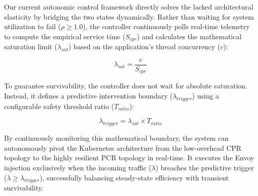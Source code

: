 \documentclass{ieeeaccess}
\begin{document}
Our current autonomic control framework directly solves the lacked architectural elasticity by bridging the two states dynamically. Rather than waiting for system utilization to fail ($\rho \ge 1.0$), the controller continuously polls real-time telemetry to compute the empirical service time ($S_{cpr}$) and calculates the mathematical saturation limit ($\lambda_{sat}$) based on the application's thread concurrency ($c$):

$$\lambda_{sat} = \frac{c}{S_{cpr}}$$

To guarantee survivability, the controller does not wait for absolute saturation. Instead, it defines a predictive intervention boundary ($\lambda_{trigger}$) using a configurable safety threshold ratio ($T_{ratio}$):

$$\lambda_{trigger} = \lambda_{sat} \times T_{ratio}$$

By continuously monitoring this mathematical boundary, the system can autonomously pivot the Kubernetes architecture from the low-overhead CPR topology to the highly resilient PCR topology in real-time. It executes the Envoy injection exclusively when the incoming traffic ($\lambda$) breaches the predictive trigger ($\lambda \ge \lambda_{trigger}$), successfully balancing steady-state efficiency with transient survivability.

\end{document}
